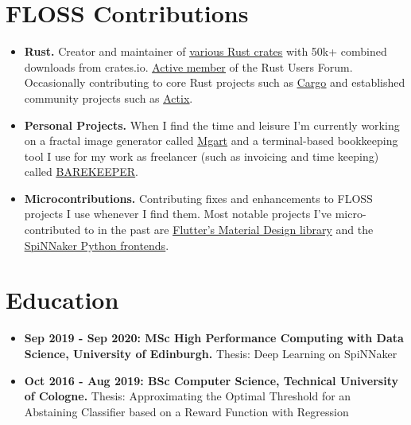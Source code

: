 \documentclass[10pt]{article}
\begin{document}
\section*{FLOSS Contributions}

\begin{itemize}[label={}, leftmargin=*]

\item \textbf{Rust.} Creator and maintainer of
  \underline{\href{https://crates.io/users/jofas}{various Rust crates}}
  with 50k+ combined downloads from crates.io.
  \underline{\href{https://users.rust-lang.org/u/jofas/summary}{Active member}}
  of the Rust Users Forum.
  Occasionally contributing to core Rust projects such as
  \underline{\href{https://github.com/rust-lang/cargo}{Cargo}} and
  established community projects such as
  \underline{\href{https://github.com/actix/}{Actix}}.

\item \textbf{Personal Projects.} When I find the time and leisure I'm
  currently working on a fractal image generator called
  \underline{\href{https://github.com/jofas/mgart}{Mgart}}
  and a terminal-based bookkeeping tool I use for my work as
  freelancer (such as invoicing and time keeping) called
  \underline{\href{https://github.com/jofas/BAREKEEPER}{BAREKEEPER}}.

\item \textbf{Microcontributions.} Contributing fixes and enhancements
  to FLOSS projects I use whenever I find them.
  Most notable projects I've micro-contributed to in the past are
  \underline{\href{https://github.com/flutter/flutter}{Flutter's Material Design library}}
  and the
  \underline{\href{https://github.com/SpiNNakerManchester}{SpiNNaker Python frontends}}.

\end{itemize}

\section*{Education}

\begin{itemize}[label={}, leftmargin=*]

\item \textbf{Sep 2019 - Sep 2020: MSc High Performance Computing with Data
  Science, University of Edinburgh.} Thesis: Deep Learning on SpiNNaker

\item \textbf{Oct 2016 - Aug 2019: BSc Computer Science, Technical
  University of Cologne.} Thesis: Approximating the Optimal Threshold
  for an Abstaining Classifier based on a Reward Function with Regression

\end{itemize}
\end{document}
